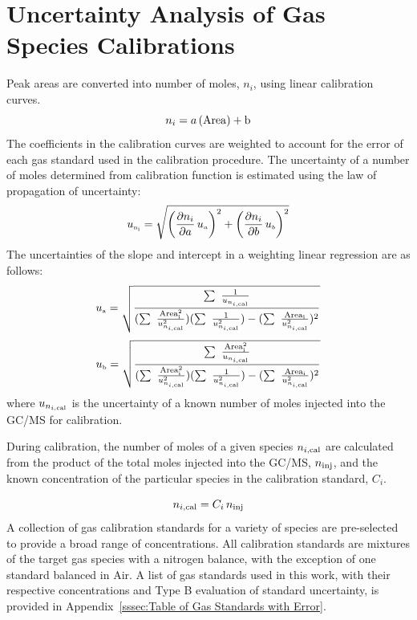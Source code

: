 \documentclass[12pt]{article}
\begin{document}
\pagebreak

\section{Uncertainty Analysis of Gas Species Calibrations}\label{sec:Uncertainty Analysis of Gas Species Calibrations}

Peak areas are converted into number of moles, $n_{i}$, using linear calibration curves.
\begin{equation}
\label{eq:Calibration Curve}
n_{i\rm} = a \, (\rm {Area})+b
\end{equation}
The coefficients in the calibration curves are weighted to account for the error of each gas standard used in the calibration procedure. The uncertainty of a number of moles determined from calibration function is estimated using the law of propagation of uncertainty:
\begin{equation}
\label{eq:Given_Moles_Uncertainty}
 u_{\rm \scriptscriptstyle n_{i}} = \sqrt{{\left( \frac{\partial n_{i}}{\partial a}\,u_{\scriptscriptstyle a} \right)}^2+{\left(\frac{\partial {n_{i}}}{\partial b}\,u_{\scriptscriptstyle b}\right)}^2}
\end{equation}
The uncertainties of the slope and intercept in a weighting linear regression are as follows:
\begin{equation}
\label{eq:Slope_Uncertainty}
u_{\rm \scriptscriptstyle a} =\sqrt{\frac{\sum~\frac{1}{u_{n_{i,\rm cal}}}}{(\sum~\frac{\rm{Area}_{i}^2}{{u_{n_{i,\rm cal}}^2}})(\sum~\frac{1}{{u_{n_{i,\rm cal}}^2}})-(\sum~\frac{\rm{Area}_{i}}{{u_{n_{i,\rm cal}}^2}})^2}}
\end{equation}
\begin{equation}
\label{eq:Intercept_Uncertainty}
u_{\rm \scriptscriptstyle b} =\sqrt{\frac{\sum~\frac{\rm{Area}_{i}^2}{u_{n_{i,\rm cal}}}}{(\sum~\frac{\rm{Area}_{i}^2}{{u_{n_{i,\rm cal}}^2}})(\sum~\frac{1}{{u_{n_{i,\rm cal}}^2}})-(\sum~\frac{\rm{Area}_{i}}{{u_{n_{i,\rm cal}}^2}})^2}}
\end{equation}
where $u_{n_{i,\rm cal}}$ is the uncertainty of a known number of moles injected into the GC/MS for calibration.

During calibration, the number of moles of a given species $n_{i,\rm cal}$ are calculated from the product of the total moles injected into the GC/MS, $n_{\rm inj}$, and the known concentration of the particular species in the calibration standard, $C_{i}$.

\begin{equation}
\label{eq:Cal_Moles}
n_{i,\rm cal} = C_{i} \, n_{\rm inj}
\end{equation}
A collection of gas calibration standards for a variety of species are pre-selected to provide a broad range of concentrations. All calibration standards are mixtures of the target gas species with a nitrogen balance, with the exception of one standard balanced in Air. A list of gas standards used in this work, with their respective concentrations and Type B evaluation of standard uncertainty, is provided in Appendix~\ref{sssec:Table of Gas Standards with Error}.
\end{document}
